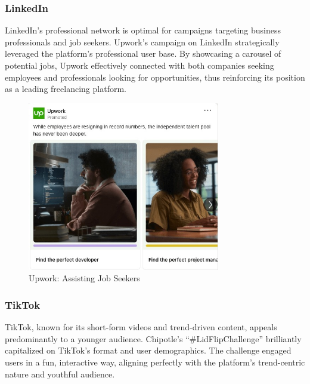 \documentclass[
]{book}
\begin{document}
\hypertarget{linkedin}{%
\subsubsection*{LinkedIn}\label{linkedin}}

LinkedIn's professional network is optimal for campaigns targeting business professionals and job seekers. Upwork's campaign on LinkedIn strategically leveraged the platform's professional user base. By showcasing a carousel of potential jobs, Upwork effectively connected with both companies seeking employees and professionals looking for opportunities, thus reinforcing its position as a leading freelancing platform.

\begin{figure}
\centering
\includegraphics[width=0.75\textwidth,height=\textheight]{images/upwork.jpg}
\caption{Upwork: Assisting Job Seekers}
\end{figure}

\hypertarget{tiktok}{%
\subsubsection*{TikTok}\label{tiktok}}

TikTok, known for its short-form videos and trend-driven content, appeals predominantly to a younger audience. Chipotle's ``\#LidFlipChallenge'' brilliantly capitalized on TikTok's format and user demographics. The challenge engaged users in a fun, interactive way, aligning perfectly with the platform's trend-centric nature and youthful audience.
\end{document}
